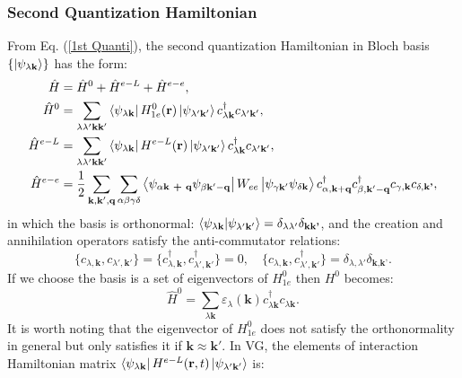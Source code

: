 \documentclass[12pt,english,a4paper]{article}
\newcommand{\dg}{\dagger}
\begin{document}
	\subsubsection{Second Quantization Hamiltonian}
	\quad From Eq. (\ref{1st Quanti}), the second quantization Hamiltonian in Bloch basis $\{\ket{\psi_{\lambda \textbf{k}}}\}$ has the form:
	\begin{align}
		\hat{H} &= \hat{H}^0 + \hat{H}^{e-L}  + \hat{H}^{e-e}\nonumber,\\
		\label{Second Hamiltonian}
		\hat{H}^0 &= \sum_{\lambda \lambda' \textbf{k}\textbf{k}'} \bra{\psi_{\lambda \textbf{k}}} H^0_{1e} (\textbf{r})\ket{\psi_{\lambda' \textbf{k}'}} c^\dg_{\lambda \textbf{k}} c_{\lambda' \textbf{k}
		'} ,\\
		\hat{H}^{e-L} &= \sum_{\lambda \lambda' \textbf{k}\textbf{k}'} \bra{\psi_{\lambda \textbf{k}}} H^{e-L} (\textbf{r})\ket{\psi_{\lambda' \textbf{k}'}} c^\dg_{\lambda \textbf{k}} c_{\lambda' \textbf{k}
			'}\nonumber ,\\
\hat{H}^{e-e}	&= \frac{1}{2} \sum_{\textbf{k}, \textbf{k}', \textbf{q}} \sum_{\alpha \beta \gamma \delta} \bra{\psi_{\alpha \textbf{k + q}} \psi_{\beta \textbf{k}' - \textbf{q}}} W_{ee} \ket{\psi_{\gamma \textbf{k}'} \psi_{\delta \textbf{k}}} c_{\alpha, \textbf{k}+\textbf{q}}^\dg c_{\beta, \textbf{k}' - \textbf{q}}^\dg c_{\gamma, \textbf{k}}c_{\delta, \textbf{k'}} \nonumber,
	\end{align}
in which the basis is orthonormal: $\braket{\psi_{\lambda \textbf{k}}}{\psi_{\lambda' \textbf{k}'}} = \delta_{\lambda\lambda'}\delta_{\textbf{k}\textbf{k'}}$, and the creation and annihilation operators satisfy the anti-commutator relations:
	\begin{equation}
		\label{fermion comm}
		\big\{c_{\lambda,\textbf{k}}, c_{\lambda', \textbf{k}'}\big\} =\big\{c^\dg_{\lambda,\textbf{k}}, c^\dg_{\lambda', \textbf{k}'}\big\} = 0, \quad \big\{c_{\lambda,\textbf{k}}, c^\dg_{\lambda', \textbf{k}'}\big\} = \delta_{\lambda,\lambda'}\delta_{\textbf{k},\textbf{k'}}.
	\end{equation}
	\quad If we choose the basis is a set of eigenvectors of $H^0_{1e}$ then $H^0$ becomes:
	\begin{equation}
		\hat{H}^0 = \sum_{\lambda \textbf{k}} \varepsilon_{\lambda}(\textbf{k})c^\dg_{\lambda \textbf{k}} c_{\lambda \textbf{k}}.
	\end{equation}
	\quad It is worth noting that the eigenvector of $H^0_{1e}$ does not satisfy the orthonormality in general but only satisfies it if $\textbf{k} \approx \textbf{k}'$. In VG, the elements of interaction Hamiltonian matrix $\bra{\psi_{\lambda\textbf{k}}}H^{e-L}(\textbf{r},t)\ket{\psi_{\lambda'\textbf{k}'}}$ is:
\end{document}
